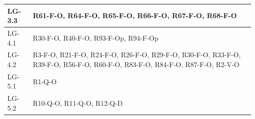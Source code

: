 {\begin{longtable}{|>{\raggedright\arraybackslash}p{3.0cm}|>{\raggedright\arraybackslash}p{12.6cm}|}
    \mbox{LG-3.3} & \mbox{R61-F-O}, \mbox{R64-F-O}, \mbox{R65-F-O}, \mbox{R66-F-O}, \mbox{R67-F-O}, \mbox{R68-F-O} \\ \hline
    \mbox{LG-4.1} & \mbox{R30-F-O}, \mbox{R40-F-O}, \mbox{R93-F-Op}, \mbox{R94-F-Op} \\ \hline
    \mbox{LG-4.2} & \mbox{R3-F-O}, \mbox{R21-F-O}, \mbox{R24-F-O}, \mbox{R26-F-O}, \mbox{R29-F-O}, \mbox{R30-F-O}, \mbox{R33-F-O}, \mbox{R39-F-O}, \mbox{R56-F-O}, \mbox{R60-F-O}, \mbox{R83-F-O}, \mbox{R84-F-O}, \mbox{R87-F-O}, \mbox{R2-V-O} \\ \hline
    \mbox{LG-5.1} & \mbox{R1-Q-O} \\ \hline
    \mbox{LG-5.2} & \mbox{R10-Q-O}, \mbox{R11-Q-O}, \mbox{R12-Q-D} \\ \hline
    \end{longtable}
}